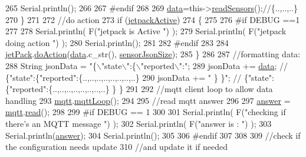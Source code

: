 \begin{DoxyCode}
265         Serial.println();
266     
267 \textcolor{preprocessor}{    #endif}
268 
269         \hyperlink{classCoolBoard_a427fb753dd8575bdf821c70a5c63d695}{data}=this->\hyperlink{classCoolBoard_ad03abdce2e65f520bbf2cff0f2d083cf}{readSensors}();\textcolor{comment}{//\{..,..,..\}}
270     \}
271     
272     \textcolor{comment}{//do action}
273     \textcolor{keywordflow}{if} (\hyperlink{classCoolBoard_a9be03a913d26e558328935ca3b59a75e}{jetpackActive})
274     \{
275     
276 \textcolor{preprocessor}{    #if DEBUG ==1}
277 
278         Serial.println( F(\textcolor{stringliteral}{"jetpack is Active "}) );
279         Serial.println( F(\textcolor{stringliteral}{"jetpack doing action "}) );
280         Serial.println();
281 
282 \textcolor{preprocessor}{    #endif}
283 
284         \hyperlink{classCoolBoard_a30b1357881b01ccbec676856a91e48e9}{jetPack}.\hyperlink{classJetpack_a86d2e83436ef4b85f4c3a6e85ac785b0}{doAction}(\hyperlink{classCoolBoard_a427fb753dd8575bdf821c70a5c63d695}{data}.c\_str(), \hyperlink{classCoolBoard_a58e4b6072e3ac8b141ec0befb479208e}{sensorJsonSize});
285     \}
286     
287     \textcolor{comment}{//formatting data:}
288     String jsonData = \textcolor{stringliteral}{"\{\(\backslash\)"state\(\backslash\)":\{\(\backslash\)"reported\(\backslash\)":"};
289     jsonData += \hyperlink{classCoolBoard_a427fb753dd8575bdf821c70a5c63d695}{data}; \textcolor{comment}{// \{"state":\{"reported":\{..,..,..,..,..,..,..,..\}}
290     jsonData += \textcolor{stringliteral}{" \} \}"}; \textcolor{comment}{// \{"state":\{"reported":\{..,..,..,..,..,..,..,..\}  \} \}}
291     
292     \textcolor{comment}{//mqtt client loop to allow data handling}
293     \hyperlink{classCoolBoard_a2399f44d7c23c1149a335cb3b46d90f1}{mqtt}.\hyperlink{classCoolMQTT_aa5eaae967b562b62cbcf2b8d81f6e5d5}{mqttLoop}();
294 
295     \textcolor{comment}{//read mqtt answer}
296     
297     \hyperlink{classCoolBoard_a7b835fafd449e5282f7f91d787a2dc15}{answer} = \hyperlink{classCoolBoard_a2399f44d7c23c1149a335cb3b46d90f1}{mqtt}.\hyperlink{classCoolMQTT_ae3c18f6ae9723746d32765f1c8f176ca}{read}();
298 
299 \textcolor{preprocessor}{#if DEBUG == 1 }
300 
301     Serial.println( F(\textcolor{stringliteral}{"checking if there's an MQTT message "})  );
302     Serial.println( F(\textcolor{stringliteral}{"answer is : "}) );    
303     Serial.println(\hyperlink{classCoolBoard_a7b835fafd449e5282f7f91d787a2dc15}{answer});   
304     Serial.println();
305 
306 \textcolor{preprocessor}{#endif  }
307 
308 
309     \textcolor{comment}{//check if the configuration needs update }
310     \textcolor{comment}{//and update it if needed }

\end{DoxyCode}
